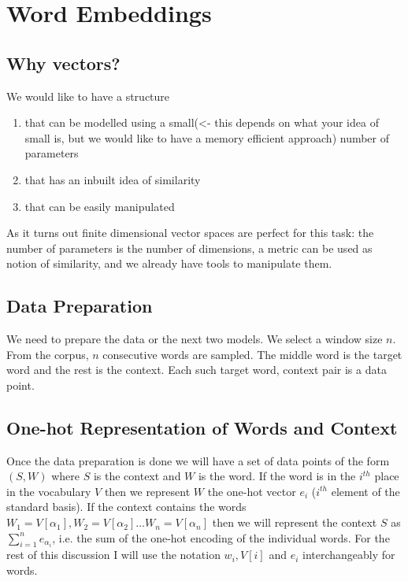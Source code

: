 \chapter{Word Embeddings}

\section{Why vectors?}
We would like to have a structure 
\begin{enumerate}
    \item that can be modelled using a small(<- this depends on what your idea of small is, but we would like to have a memory efficient approach) number of parameters
    \item that has an inbuilt idea of similarity
    \item that can be easily manipulated
\end{enumerate}
As it turns out finite dimensional vector spaces are perfect for this task: the number of parameters is the number of dimensions, a metric can be used as notion of similarity, and we already have tools to manipulate them.





\section{Data Preparation}
We need to prepare the data or the next two models. We select a window size $n$. From the corpus, $n$ consecutive words are sampled. The middle word is the target word and the rest is the context. Each such target word, context pair is a data point.



\section{One-hot Representation of Words and Context}

Once the data preparation is done we will have a set of data points of the form $(S,W)$ where $S$ is the context and $W$ is the word. If the word is in the $i^{th}$ place in the vocabulary $V$ then we represent $W$ the one-hot vector $e_i$ ($i^{th}$ element of the standard basis). If the context contains the words $W_1=V[\alpha_1], W_2=V[\alpha_2]\hdots W_n=V[\alpha_n]$ then we will represent the context $S$ as $\sum_{i=1}^ne_{\alpha_i}$, i.e. the sum of the one-hot encoding of the individual words. For the rest of this discussion I will use the notation $w_i,V[i]$ and $e_i$ interchangeably for words. 








